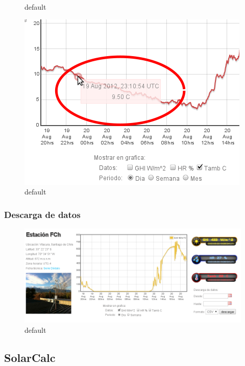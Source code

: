\begin{figure}[ht]
\begin{minipage}[b]{0.45\linewidth}
                \caption{default}
                \label{fig:figure1}
        \end{minipage}
	\begin{minipage}[b]{0.45\linewidth}
                \centering
                \includegraphics[width=\textwidth]{./images/cap5chap1img4-3}
                \caption{default}
                \label{fig:figure1}
        \end{minipage}
\end{figure}
\subsubsection{Descarga de datos}
\begin{figure}[ht]
        \centering
        \includegraphics[width=\textwidth]{./images/cap5chap1img0}
        \caption{default}
        \label{fig:figure1}
\end{figure}

\subsection{SolarCalc}
